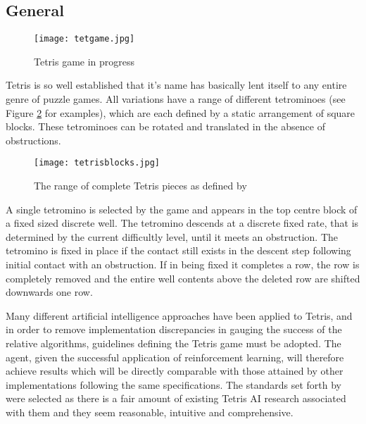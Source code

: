 \documentclass{rucsthesis}
\begin{document}
\subsection{General}

\begin{figure}[h]
\centering%
\texttt{[image: tetgame.jpg]}
\caption{Tetris game in progress}
\label{fig:tetgame}
\end{figure}

Tetris is so well established that it's name has basically lent itself to any entire genre of puzzle games. All variations have a range of different tetrominoes (see Figure \ref{fig:pieces} for examples), which are each defined by a static arrangement of square blocks. These tetrominoes can be rotated and translated in the absence of obstructions. 

\begin{figure}[h]
\centering
\texttt{[image: tetrisblocks.jpg]}
\caption{The range of complete Tetris pieces as defined by \cite{tetstand}}
\label{fig:pieces}
\end{figure}
 
A  single tetromino is selected by the game and appears in the top centre block of a fixed sized discrete well. The tetromino descends at a discrete fixed rate, that is determined by the current difficultly level, until it meets an obstruction. The tetromino is fixed in place if the contact still exists in the descent step following initial contact with an obstruction. If in being fixed it completes a row, the row is completely removed and the entire well contents above the deleted row are shifted downwards one row.

Many different artificial intelligence approaches have been applied to Tetris, and in order to remove implementation discrepancies in gauging the success of the relative algorithms, guidelines defining the Tetris game must be adopted. The agent, given the successful application of reinforcement learning, will therefore achieve results which will be directly comparable with those attained by other implementations following the same specifications. The standards set forth by \cite{tetstand} were selected as there is a fair amount of existing Tetris AI research associated with them and they seem reasonable, intuitive and comprehensive.
\end{document}
